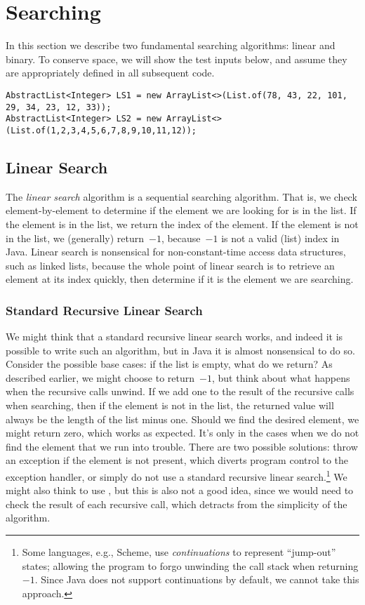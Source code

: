 \section{Searching}
In this section we describe two fundamental searching algorithms: linear and binary.
To conserve space, we will show the test inputs below, and assume they are appropriately defined in all subsequent code.

\begin{small}
\begin{verbatim}
AbstractList<Integer> LS1 = new ArrayList<>(List.of(78, 43, 22, 101, 29, 34, 23, 12, 33));
AbstractList<Integer> LS2 = new ArrayList<>(List.of(1,2,3,4,5,6,7,8,9,10,11,12));
\end{verbatim}  
\end{small}

\subsection{Linear Search}
The \emph{linear search} algorithm is a sequential searching algorithm. 
That is, we check element-by-element to determine if the element we are looking for is in the list. 
If the element is in the list, we return the index of the element. 
If the element is not in the list, we (generally) return~$-1$, because~$-1$ is not a valid (list) index in Java. 
Linear search is nonsensical for non-constant-time access data structures, such as linked lists, because the whole point of linear search is to retrieve an element at its index quickly, then determine if it is the element we are searching. 

\subsubsection*{Standard Recursive Linear Search}
We might think that a standard recursive linear search works, and indeed it is possible to write such an algorithm, but in Java it is almost nonsensical to do so. 
Consider the possible base cases: if the list is empty, what do we return? 
As described earlier, we might choose to return~$-1$, but think about what happens when the recursive calls unwind. 
If we add one to the result of the recursive calls when searching, then if the element is not in the list, the returned value will always be the length of the list minus one. 
Should we find the desired element, we might return zero, which works as expected. 
It's only in the cases when we do not find the element that we run into trouble. There are two possible solutions: throw an exception if the element is not present, which diverts program control to the exception handler, or simply do not use a standard recursive linear search.\footnote{Some languages, e.g., Scheme, use \emph{continuations} to represent ``jump-out'' states; allowing the program to forgo unwinding the call stack when returning $-1$. Since Java does not support continuations by default, we cannot take this approach.} 
We might also think to use , but this is also not a good idea, since we would need to check the result of each recursive call, which detracts from the simplicity of the algorithm.

